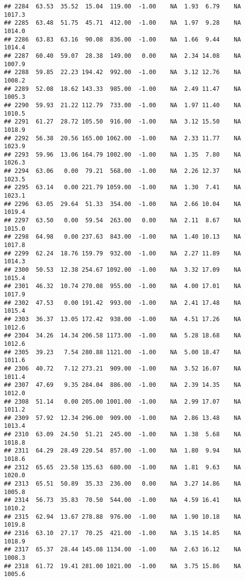 \documentclass{article}\usepackage{graphicx, color}
\makeatletter
\newenvironment{kframe}{%
 \def\at@end@of@kframe{}%
 \ifinner\ifhmode%
  \def\at@end@of@kframe{\end{minipage}}%
  \begin{minipage}{\columnwidth}%
 \fi\fi%
 \def\FrameCommand##1{\hskip\@totalleftmargin \hskip-\fboxsep
 \colorbox{shadecolor}{##1}\hskip-\fboxsep
     \hskip-\linewidth \hskip-\@totalleftmargin \hskip\columnwidth}%
 \MakeFramed {\advance\hsize-\width
   \@totalleftmargin\z@ \linewidth\hsize
   \@setminipage}}%
 {\par\unskip\endMakeFramed%
 \at@end@of@kframe}
\newenvironment{knitrout}{}{} %
\makeatother
\begin{document}
\begin{knitrout}
\begin{kframe}
\begin{verbatim}
## 2284  63.53  35.52  15.04  119.00  -1.00    NA  1.93  6.79    NA 1017.3
## 2285  63.48  51.75  45.71  412.00  -1.00    NA  1.97  9.28    NA 1014.0
## 2286  63.83  63.16  90.08  836.00  -1.00    NA  1.66  9.44    NA 1014.4
## 2287  60.40  59.07  28.38  149.00   0.00    NA  2.34 14.08    NA 1007.9
## 2288  59.85  22.23 194.42  992.00  -1.00    NA  3.12 12.76    NA 1008.2
## 2289  52.08  18.62 143.33  985.00  -1.00    NA  2.49 11.47    NA 1005.3
## 2290  59.93  21.22 112.79  733.00  -1.00    NA  1.97 11.40    NA 1010.5
## 2291  61.27  28.72 105.50  916.00  -1.00    NA  3.12 15.50    NA 1018.9
## 2292  56.38  20.56 165.00 1062.00  -1.00    NA  2.33 11.77    NA 1023.9
## 2293  59.96  13.06 164.79 1002.00  -1.00    NA  1.35  7.80    NA 1026.3
## 2294  63.06   0.00  79.21  568.00  -1.00    NA  2.26 12.37    NA 1023.5
## 2295  63.14   0.00 221.79 1059.00  -1.00    NA  1.30  7.41    NA 1023.1
## 2296  63.05  29.64  51.33  354.00  -1.00    NA  2.66 10.04    NA 1019.4
## 2297  63.50   0.00  59.54  263.00   0.00    NA  2.11  8.67    NA 1015.0
## 2298  64.98   0.00 237.63  843.00  -1.00    NA  1.40 10.13    NA 1017.8
## 2299  62.24  18.76 159.79  932.00  -1.00    NA  2.27 11.89    NA 1014.3
## 2300  50.53  12.38 254.67 1092.00  -1.00    NA  3.32 17.09    NA 1015.4
## 2301  46.32  10.74 270.08  955.00  -1.00    NA  4.00 17.01    NA 1017.9
## 2302  47.53   0.00 191.42  993.00  -1.00    NA  2.41 17.48    NA 1015.4
## 2303  36.37  13.05 172.42  938.00  -1.00    NA  4.51 17.26    NA 1012.6
## 2304  34.26  14.34 206.58 1173.00  -1.00    NA  5.28 18.68    NA 1012.6
## 2305  39.23   7.54 280.88 1121.00  -1.00    NA  5.00 18.47    NA 1011.6
## 2306  40.72   7.12 273.21  909.00  -1.00    NA  3.52 16.07    NA 1011.4
## 2307  47.69   9.35 284.04  886.00  -1.00    NA  2.39 14.35    NA 1012.0
## 2308  51.14   0.00 205.00 1001.00  -1.00    NA  2.99 17.07    NA 1011.2
## 2309  57.92  12.34 296.00  909.00  -1.00    NA  2.86 13.48    NA 1013.4
## 2310  63.09  24.50  51.21  245.00  -1.00    NA  1.38  5.68    NA 1018.8
## 2311  64.29  28.49 220.54  857.00  -1.00    NA  1.80  9.94    NA 1018.6
## 2312  65.65  23.58 135.63  680.00  -1.00    NA  1.81  9.63    NA 1020.0
## 2313  65.51  50.89  35.33  236.00   0.00    NA  3.27 14.86    NA 1005.8
## 2314  56.73  35.83  70.50  544.00  -1.00    NA  4.59 16.41    NA 1010.2
## 2315  62.94  13.67 278.88  976.00  -1.00    NA  1.90 10.18    NA 1019.8
## 2316  63.10  27.17  70.25  421.00  -1.00    NA  3.15 14.85    NA 1018.9
## 2317  65.37  28.44 145.08 1134.00  -1.00    NA  2.63 16.12    NA 1008.3
## 2318  61.72  19.41 281.00 1021.00  -1.00    NA  3.75 15.86    NA 1005.6

\end{verbatim}
\end{kframe}
\end{knitrout}
\end{document}
